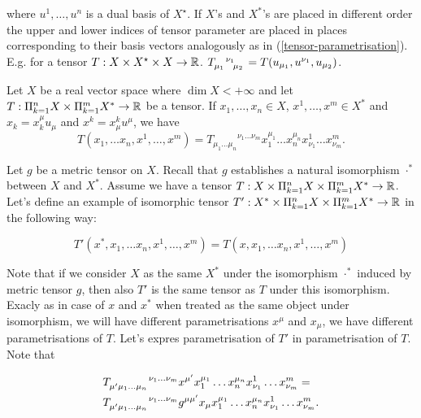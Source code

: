 \documentclass[main.tex]{subfiles}
\begin{document}
where $u^1, \dots, u^n$ is a dual basis of $X^\star$. If $X$'s and $X^*$'s are placed in different order the upper and lower indices of tensor parameter are placed in places corresponding to their basis vectors analogously as in (\ref{tensor-parametrisation}). E.g. for a tensor $T:X\times X^\star\times X\to\mathbb{R}$. 
$\tensor{T}{_{\mu_1}^{\nu_1}_{\mu_2}} = T(u_{\mu_1}, u^{\nu_1}, u_{\mu_2})$.

\begin{corollary}
Let $X$ be a real vector space where $\dim X < +\infty$ and let $T:\Pi_{k=1}^n X \times \Pi_{k=1}^m X^*\to\mathbb{R}$ be a tensor. If $x_1, \dots, x_n\in X$,
$x^1, \dots, x^m\in X^*$ and
$x_k = x^\mu_k u_\mu$ and $x^k = x^k_\mu u^\mu$, we have
\begin{equation}
\label{tensor-param-definition}
T(x_1, \dots x_n, x^1, \dots, x^m) = {T_{\mu_1\dots\mu_n}}^{\nu_1\dots\nu_m} 
x_1^{\mu_1} \dots x_n^{\mu_n} x^1_{\nu_1} \dots x^m_{\nu_m}.
\end{equation}
\end{corollary}


Let $g$ be a metric tensor on $X$. Recall that $g$ establishes a natural isomorphism $\cdot^*$ between $X$ and $X^*$. Assume we have a tensor $T:X \times \Pi_{k=1}^n X \times \Pi_{k=1}^m X^*\to\mathbb{R}$. Let's define an example of isomorphic tensor $T': X^* \times \Pi_{k=1}^n X \times \Pi_{k=1}^m X^*\to\mathbb{R}$ in the following way: 

\begin{equation}
\label{tensor-isometry}
T'(x^*, x_1, \dots x_n, x^1, \dots, x^m) = T(x, x_1, \dots x_n, x^1, \dots, x^m)
\end{equation}

Note that if we consider $X$ as the same $X^*$ under the isomorphism $\cdot^*$ induced by metric tensor $g$, then also $T'$ is the same tensor as $T$ under this isomorphism. Exacly as in case of $x$ and $x^*$ when treated as the same object under isomorphism, we will have different parametrisations $x^\mu$ and $x_\mu$, we have different parametrisations of $T$. Let's expres parametrisation of $T'$ in parametrisation of $T$. Note that

\begin{align*}
& \tensor{{T}}{_{\mu'}_{\mu_1\dots\mu_n}^{\nu_1\dots\nu_m}} x^{\mu'} x_1^{\mu_1} \dots x_n^{\mu_n} x^1_{\nu_1} \dots x^m_{\nu_m} = \\
& \tensor{{T}}{_{\mu'}_{\mu_1\dots\mu_n}^{\nu_1\dots\nu_m}} g^{\mu \mu'} x_{\mu} x_1^{\mu_1} \dots x_n^{\mu_n} x^1_{\nu_1} \dots x^m_{\nu_m}.
\end{align*}
\end{document}
